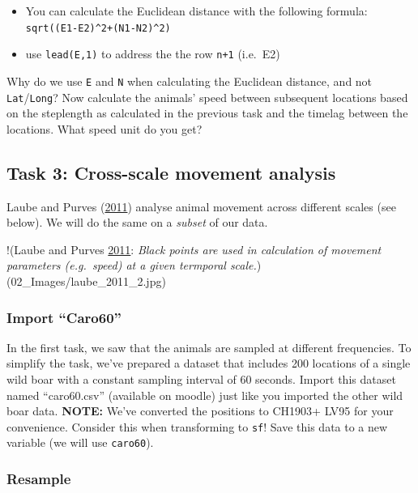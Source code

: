 \documentclass[]{book}
\providecommand{\tightlist}{%
  \setlength{\itemsep}{0pt}\setlength{\parskip}{0pt}}
\begin{document}
\begin{itemize}
\tightlist
\item
  You can calculate the Euclidean distance with the following formula: \texttt{sqrt((E1-E2)\^{}2+(N1-N2)\^{}2)}
\item
  use \texttt{lead(E,1)} to address the the row \texttt{n+1} (i.e.~E2)
\end{itemize}

Why do we use \texttt{E} and \texttt{N} when calculating the Euclidean distance, and not \texttt{Lat}/\texttt{Long}? Now calculate the animals' speed between subsequent locations based on the steplength as calculated in the previous task and the timelag between the locations. What speed unit do you get?

\hypertarget{task-3-cross-scale-movement-analysis}{%
\subsection{Task 3: Cross-scale movement analysis}\label{task-3-cross-scale-movement-analysis}}

Laube and Purves (\protect\hyperlink{ref-laube2011}{2011}) analyse animal movement across different scales (see below). We will do the same on a \emph{subset} of our data.

!(Laube and Purves \protect\hyperlink{ref-laube2011}{2011}: \emph{Black points are used in calculation of movement parameters (e.g.~speed) at a given termporal scale.})(02\_Images/laube\_2011\_2.jpg)

\hypertarget{import-caro60}{%
\subsubsection{Import ``Caro60''}\label{import-caro60}}

In the first task, we saw that the animals are sampled at different frequencies. To simplify the task, we've prepared a dataset that includes 200 locations of a single wild boar with a constant sampling interval of 60 seconds. Import this dataset named ``caro60.csv'' (available on moodle) just like you imported the other wild boar data. \textbf{NOTE:} We've converted the positions to CH1903+ LV95 for your convenience. Consider this when transforming to \texttt{sf}!
Save this data to a new variable (we will use \texttt{caro60}).

\hypertarget{resample}{%
\subsubsection{Resample}\label{resample}}
\end{document}
